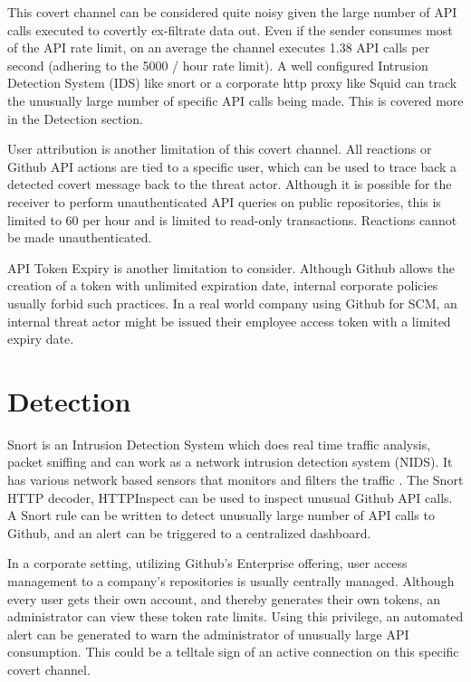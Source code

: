 \documentclass[conference]{IEEEtran}
\begin{document}
This covert channel can be considered quite noisy given the large number of API calls executed to covertly ex-filtrate data out. Even if the sender consumes most of the API rate limit, on an average the channel executes 1.38 API calls per second (adhering to the 5000 / hour rate limit). A well configured Intrusion Detection System (IDS) like snort or a corporate http proxy like Squid can track the unusually large number of specific API calls being made. This is covered more in the Detection section.

User attribution is another limitation of this covert channel. All reactions or Github API actions are tied to a specific user, which can be used to trace back a detected covert message back to the threat actor. Although it is possible for the receiver to perform unauthenticated API queries on public repositories, this is limited to 60 per hour and is limited to read-only transactions. Reactions cannot be made unauthenticated.

API Token Expiry is another limitation to consider. Although Github allows the creation of a token with unlimited expiration date, internal corporate policies usually forbid such practices. In a real world company using Github for SCM, an internal threat actor might be issued their employee access token with a limited expiry date. 

\section{Detection}

Snort is an Intrusion Detection System which does real time traffic analysis, packet sniffing and can work as a network intrusion detection system (NIDS). It has various network based sensors that monitors and filters the traffic \cite{b9}. The Snort HTTP decoder, HTTPInspect can be used to inspect unusual Github API calls. A Snort rule can be written to detect unusually large number of API calls to Github, and an alert can be triggered to a centralized dashboard. 

In a corporate setting, utilizing Github’s Enterprise offering, user access management to a company’s repositories is usually centrally managed. Although every user gets their own account, and thereby generates their own tokens, an administrator can view these token rate limits. Using this privilege, an automated alert can be generated to warn the administrator of unusually large API consumption. This could be a telltale sign of an active connection on this specific covert channel.
\end{document}

